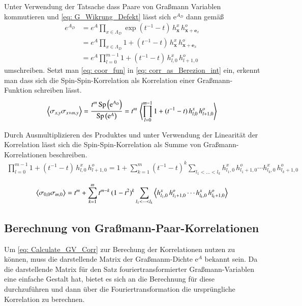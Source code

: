 \noindent Unter Verwendung der Tatsache dass Paare von Graßmann Variablen kommutieren und \eqref{eq: G_Wikrung_Defekt} lässt sich $\mathrm{e}^{A_D}$ dann gemäß 
\begin{align}
e^{A_D} 
    & = e^{A} \prod_{x \in \Lambda_D} \exp{(t^{-1} - t)\, h_{\bm{x}}^x\, h_{\bm{x} + \bm{e}_x}^o} \nonumber \\
    & = e^{A} \prod_{x \in \Lambda_D} 1 + (t^{-1} - t)\, h_{\bm{x}}^x\, h_{\bm{x} + \bm{e}_x}^o \nonumber \\
    & = e^{A} \prod_{l = 0}^{m-1} 1 + (t^{-1} - t)\, h_{l,0}^x\, h_{l+1,0}^o \label{eq: coor_fun}
\end{align}
umschreiben. Setzt man \eqref{eq: coor_fun} in \eqref{eq: corr_as_Berezion_int} ein, erkennt man dass sich die Spin-Spin-Korrelation als Korrelation einer Graßmann-Funktion schreiben lässt.  
\begin{equation} \nonumber
\left\langle \sigma_{x,y} \sigma_{x+m,y} \right\rangle 
    =\frac{t^m \, \mathrm{Sp}\left( \mathrm{e}^{A_D} \right)}{\mathrm{Sp}\left( \mathrm{e}^A \right)} 
    =  t^m \, \left\langle \prod_{l = 0}^{m-1} 1 + (t^{-1} - t)\, h_{l,0}^x\, h_{l+1,0}^o \right\rangle 
\end{equation}

\noindent Durch Ausmultiplizieren des Produktes und unter Verwendung der Linearität der Korrelation lässt sich die Spin-Spin-Korrelation als Summe von Graßmann-Korrelationen beschreiben. 
\begin{align}
\prod_{l = 0}^{m-1} 1 + (t^{-1} - t)\, h_{l,0}^x\, h_{l+1,0}^o
= 1 + \sum_{k = 1}^{m} (t^{-1}-t)^k \sum_{l_1 < \dots < l_k} h_{l_1,0}^x\, h_{l_1+1,0}^o \cdots h_{l_k,0}^x\, h_{l_k+1,0}^o
\end{align}

\begin{grayframe}[frametitle = {Spin-Spin-Korrelation als Summe von Graßmann-Korrelationen}]
\begin{equation} \label{eq: Spin-Spin-Corr as Sum of GV corr}
    \left\langle \sigma_{0,0} \sigma_{m,0} \right\rangle = t^m  + \sum_{k = 1}^{m} t^{m-k} \, (1-t^2)^{k} \sum_{l_1 < \dots < l_k}  \left\langle h_{l_1,0}^x\, h_{l_1+1,0}^o \cdots h_{l_k,0}^x\, h_{l_k+1,0}^o \right\rangle
\end{equation}
\end{grayframe}

\subsection{Berechnung von Graßmann-Paar-Korrelationen}
Um \eqref{eq: Calculate_GV_Corr} zur Berechung der Korrelationen nutzen zu können, muss die darstellende Matrix der Graßmanm-Dichte ${\mathrm{e}^A}$ bekannt sein. Da die darstellende Matrix für den Satz fouriertransformierter Graßmann-Variablen eine einfache Gestalt hat, bietet es sich an die Berechnung für diese durchzuführen und dann über die Fouriertransformation die ursprüngliche Korrelation zu berechnen. 

